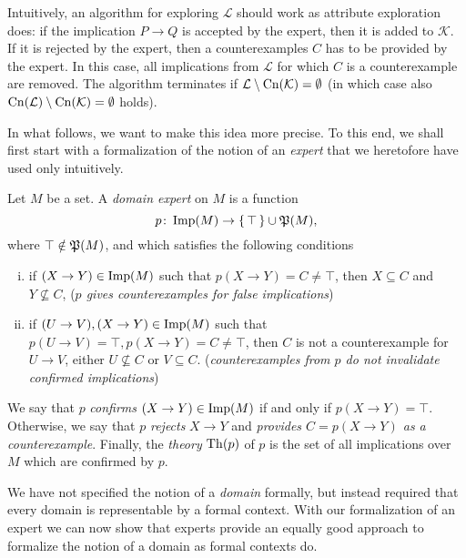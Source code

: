Intuitively, an algorithm for exploring $\mathcal{L}$ should work as attribute exploration
does: if the implication $P \to Q$ is accepted by the expert, then it is added to
$\mathcal{K}$.  If it is rejected by the expert, then a counterexamples $C$ has to be
provided by the expert.  In this case, all implications from $\mathcal{L}$ for which $C$
is a counterexample are removed.  The algorithm terminates if $\mathcal{L} \setminus
\operatorname{Cn}(\mathcal{K}) = \emptyset$ (in which case also $\operatorname{Cn}(\mathcal{L}) \setminus
\operatorname{Cn}(\mathcal{K}) = \emptyset$ holds).

In what follows, we want to make this idea more precise.  To this end, we shall first
start with a formalization of the notion of an \emph{expert} that we heretofore have used
only intuitively.

\begin{Definition}
  \label{def:domain-expert}
  Let $M$ be a set.  A \emph{domain expert} on $M$ is a function
  \begin{equation*}
    p \colon \operatorname{Imp}(M) \to {\ensuremath{\{\, \top \,\}}} \cup {\ensuremath{\mathfrak{P}(M)}},
  \end{equation*}
  where $\top \notin {\ensuremath{\mathfrak{P}(M)}}$, and which satisfies the following conditions
  \begin{enumerate}[i. ]
  \item if $(X \to Y) \in \operatorname{Imp}(M)$ such that $p(X \to Y) = C \neq \top$, then $ X
    \subseteq C$ and $Y \not\subseteq C$, (\emph{$p$ gives counterexamples for false
      implications})
  \item if $(U \to V), (X \to Y) \in \operatorname{Imp}(M)$ such that $p(U \to V) = \top, p(X \to Y) = C
    \neq \top$, then $C$ is not a counterexample for $U \to V$, \ie either $U
    \not\subseteq C$ or $V \subseteq C$. (\emph{counterexamples from $p$ do not invalidate
      confirmed implications})
  \end{enumerate}
  We say that $p$ \emph{confirms} $(X \to Y) \in \operatorname{Imp}(M)$ if and only if $p(X \to Y) =
  \top$.  Otherwise, we say that $p$ \emph{rejects} $X \to Y$ and \emph{provides $C = p(X
    \to Y)$ as a counterexample}.  Finally, the \emph{theory} $\operatorname{Th}(p)$ of $p$ is the set
  of all implications over $M$ which are confirmed by $p$.
\end{Definition}

We have not specified the notion of a \emph{domain} formally, but instead required that
every domain is representable by a formal context.  With our formalization of an expert we
can now show that experts provide an equally good approach to formalize the notion of a
domain as formal contexts do.

